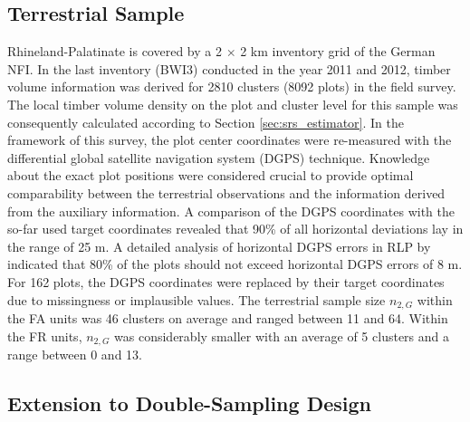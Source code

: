 \documentclass[remotesensing,article,accept,moreauthors,pdftex,10pt,a4paper]{Definitions/mdpi}
\begin{document}
\subsection{Terrestrial Sample}

Rhineland-Palatinate is covered by a 2 $\times$ 2 km inventory grid of the German NFI. In the last inventory (BWI3) conducted in the year 2011 and 2012, timber volume information was derived for 2810 clusters (8092 plots) in the field survey. The local timber volume density on the plot and cluster level for this sample was consequently calculated according to Section \ref{sec:srs_estimator}. In the framework of this survey, the plot center coordinates were re-measured with the differential global satellite navigation system (DGPS) technique. Knowledge about the exact plot positions were considered crucial to provide optimal comparability between the terrestrial observations and the information derived from the auxiliary information. A comparison of the DGPS coordinates with the so-far used target coordinates revealed that 90\% of all horizontal deviations lay in the range of 25 m. A detailed analysis of horizontal DGPS errors in RLP by \citet{lambrecht2017} indicated that 80\% of the plots should not exceed horizontal DGPS errors of 8 m. For 162 plots, the DGPS coordinates were replaced by their target coordinates due to missingness or implausible values. The terrestrial sample size $n_{2,G}$ within the FA units was 46 clusters on average and ranged between 11 and 64. Within the FR units, $n_{2,G}$ was considerably smaller with an average of 5 clusters and a range between 0 and 13.



\subsection{Extension to Double-Sampling Design}
\label{ext_to_2phase}
\end{document}
